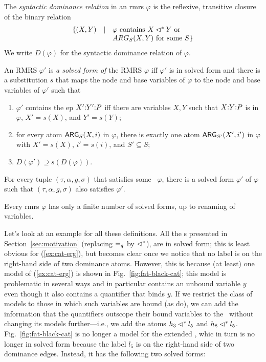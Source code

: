 \begin{definition}  \label{defn:solved-form-of}
  The \emph{syntactic dominance relation} in an {\sc  rmrs} $\varphi$ is the
  reflexive, transitive closure of the binary relation $$
\begin{array}{r c l}
\{(X,Y) & \mid &  \mbox{$\varphi$ contains $X \lhd^* Y$ or}\\
&& \mbox{$ARG_S(X,Y)$ for some
    $S$}\}
\end{array}
$$  
We write $D(\varphi)$ for the syntactic dominance
  relation of $\varphi$.

  An RMRS $\varphi'$ is \emph{a solved form of} the RMRS $\varphi$
  iff $\varphi'$ is in solved form and there is a substitution $s$
  that maps the  node and base variables of $\varphi$ to the node and
  base variables of $\varphi'$ such that
  \begin{enumerate}
  \item $\varphi'$ contains the {\sc ep} $X' {:} Y' {:} P$ iff there are
    variables $X,Y$ such that $X {:} Y {:} P$ is in $\varphi$, $X' =
    s(X)$, and $Y' = s(Y)$;
  \item for every atom $\mathsf{ARG}_S(X,i)$ in $\varphi$, there is exactly
    one atom $\mathsf{ARG}_{S'}(X',i')$ in $\varphi$ with $X' = s(X)$, $i' =
    s(i)$, and $S' \subseteq S$;
  \item $D(\varphi') \supseteq s(D(\varphi))$.
  \end{enumerate}
\end{definition}

\begin{prop} \label{prop:models-satisfy-solved-forms}
  For every tuple $(\tau,\alpha,g,\sigma)$ that satisfies some \rmrs\
  $\varphi$, there is a solved form $\varphi'$ of $\varphi$ such that
  $(\tau,\alpha,g,\sigma)$ also satisfies $\varphi'$.
\end{prop}

\begin{prop}  \label{prop:finite-solved-forms}
  Every {\sc rmrs} $\varphi$ has only a finite number of solved forms, up to
  renaming of variables.
\end{prop}

Let's look at an example for all these definitions.  All the \rmrs s
presented in Section~\ref{sec:motivation} (replacing $=_q$ by
$\lhd^*$), are in solved form; this is least obvious for
(\ref{ex:cat-erg}), but becomes clear once we notice that no label is
on the right-hand side of two dominance atoms.  However, this is
because (at least) one model of (\ref{ex:cat-erg}) is
shown in Fig.~\ref{fig:fat-black-cat}; this model
is problematic in several ways and in particular contains an unbound
variable $y$ even though it also contains a quantifier that binds $y$.
If we restrict the class of models to those in 
which such variables are bound (as  do),
we can add the information that the 
quantifiers outscope their bound variables to the \rmrs\ without
changing its models further---i.e., we add the atoms $h_3 \lhd^*
l_5$ and $h_8 \lhd^* l_5$.  Fig.~\ref{fig:fat-black-cat} is no longer a
model for the extended \rmrs, whic in turn is no longer in solved
form because the label $l_5$ is on the right-hand side of two
dominance edges.  Instead, it has the following two solved forms:

